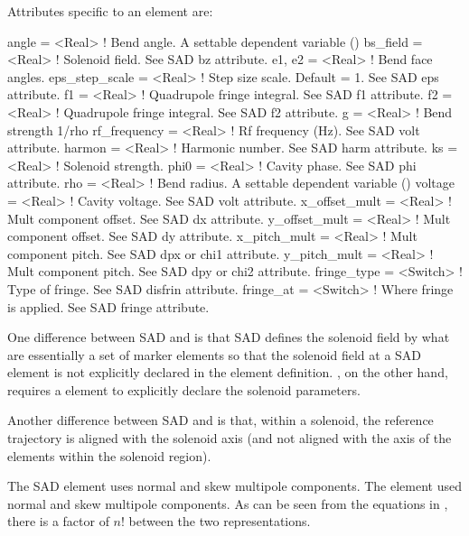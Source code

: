 {
Attributes specific to an  element are:
\begin{example}
  angle           = <Real>    ! Bend angle. A settable dependent variable ()
  bs_field        = <Real>    ! Solenoid field. See SAD bz attribute.
  e1, e2          = <Real>    ! Bend face angles.
  eps_step_scale  = <Real>    ! Step size scale. Default = 1. See SAD eps attribute.
  f1              = <Real>    ! Quadrupole fringe integral. See SAD f1 attribute.
  f2              = <Real>    ! Quadrupole fringe integral. See SAD f2 attribute.
  g               = <Real>    ! Bend strength 1/rho
  rf_frequency    = <Real>    ! Rf frequency (Hz). See SAD volt attribute.
  harmon          = <Real>    ! Harmonic number. See SAD harm attribute.
  ks              = <Real>    ! Solenoid strength. 
  phi0            = <Real>    ! Cavity phase. See SAD phi attribute.
  rho             = <Real>    ! Bend radius. A settable dependent variable ()
  voltage         = <Real>    ! Cavity voltage. See SAD volt attribute.
  x_offset_mult   = <Real>    ! Mult component offset. See SAD dx attribute.
  y_offset_mult   = <Real>    ! Mult component offset. See SAD dy attribute.
  x_pitch_mult    = <Real>    ! Mult component pitch. See SAD dpx or chi1 attribute.
  y_pitch_mult    = <Real>    ! Mult component pitch. See SAD dpy or chi2 attribute.
  fringe_type     = <Switch>  ! Type of fringe. See SAD disfrin attribute.
  fringe_at       = <Switch>  ! Where fringe is applied. See SAD fringe attribute.
\end{example}

One difference between SAD and \bmad is that SAD defines the solenoid
field by what are essentially a set of marker elements so that the
solenoid field at a SAD  element is not explicitly declared
in the  element definition. \bmad, on the other hand,
requires a  element to explicitly declare the solenoid
parameters.

Another difference between SAD and \bmad is that, within a solenoid,
the reference trajectory is aligned with the solenoid axis (and not
aligned with the axis of the elements within the solenoid region).

The SAD  element uses normal  and skew 
multipole components. The \bmad {} element used normal
 and skew  multipole components. As can be seen from the
equations in , there is a factor of $n!$ between the
two representations.

}
